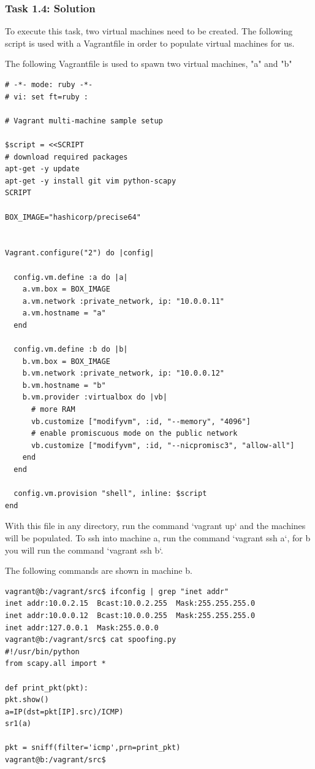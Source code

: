 \documentclass[12pt]{article}
\begin{document}
\subsubsection{Task 1.4: Solution}
To execute this task, two virtual machines need to be created. The following script is used with a Vagrantfile in order to populate virtual machines for us.

The following Vagrantfile is used to spawn two virtual machines, "a" and "b"


\begin{verbatim}
# -*- mode: ruby -*-
# vi: set ft=ruby :

# Vagrant multi-machine sample setup

$script = <<SCRIPT
# download required packages
apt-get -y update
apt-get -y install git vim python-scapy
SCRIPT

BOX_IMAGE="hashicorp/precise64"


Vagrant.configure("2") do |config|

  config.vm.define :a do |a|
    a.vm.box = BOX_IMAGE
    a.vm.network :private_network, ip: "10.0.0.11"
    a.vm.hostname = "a"
  end

  config.vm.define :b do |b|
    b.vm.box = BOX_IMAGE
    b.vm.network :private_network, ip: "10.0.0.12"
    b.vm.hostname = "b"
    b.vm.provider :virtualbox do |vb|
      # more RAM
      vb.customize ["modifyvm", :id, "--memory", "4096"]
      # enable promiscuous mode on the public network
      vb.customize ["modifyvm", :id, "--nicpromisc3", "allow-all"]
    end
  end

  config.vm.provision "shell", inline: $script
end
\end{verbatim}

With this file in any directory, run the command `vagrant up` and the machines will be populated. To ssh into machine a, run the command `vagrant ssh a`, for b you will run the command `vagrant ssh b`.

The following commands are shown in machine b.


\begin{verbatim}
vagrant@b:/vagrant/src$ ifconfig | grep "inet addr"
inet addr:10.0.2.15  Bcast:10.0.2.255  Mask:255.255.255.0
inet addr:10.0.0.12  Bcast:10.0.0.255  Mask:255.255.255.0
inet addr:127.0.0.1  Mask:255.0.0.0
vagrant@b:/vagrant/src$ cat spoofing.py
#!/usr/bin/python
from scapy.all import *

def print_pkt(pkt):
pkt.show()
a=IP(dst=pkt[IP].src)/ICMP)
sr1(a)

pkt = sniff(filter='icmp',prn=print_pkt)
vagrant@b:/vagrant/src$
\end{verbatim}
\end{document}
